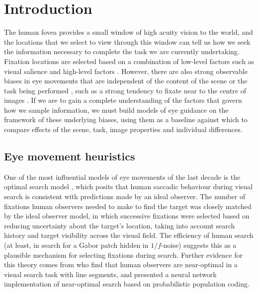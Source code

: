 \section{Introduction}

The human fovea provides a small window of high acuity vision to the world, and the locations that we select to view through this window can tell us how we seek the information necessary to complete the task we are currently undertaking. Fixation locations are selected based on a combination of low-level factors such as visual salience \citep{borji2013} and high-level factors \citep{yarbus1967, buswell1935, land2001}. However, there are also strong observable biases in eye movements that are independent of the content of the scene or the task being performed \citep{tatler-vincent2009, foulsham2010}, such as a strong tendency to fixate near to the centre of images \citep{tatler2007, canosa2003, stainer2013}. If we are to gain a complete understanding of the factors that govern how we sample information, we must build models of eye guidance on the framework of these underlying biases, using them as a baseline against which to compare effects of the scene, task, image properties and individual differences.

\subsection{Eye movement heuristics}

One of the most influential models of eye movements of the last decade is the optimal search model \citep{najemnik-geisler2008}, which posits that human saccadic behaviour during visual search is consistent with predictions made by an ideal observer. The number of fixations human observers needed to make to find the target was closely matched by the ideal observer model, in which successive fixations were selected based on reducing uncertainty about the target's location, taking into account search history and target visibility across the visual field. The efficiency of human search (at least, in search for a Gabor patch hidden in $1/f$-noise) suggests this as a plausible mechanism for selecting fixations during search. Further evidence for this theory comes from \cite{ma2011} who find that human observers are near-optimal in a visual search task with line segments, and presented a neural network implementation of near-optimal search based on probabilistic population coding.  

